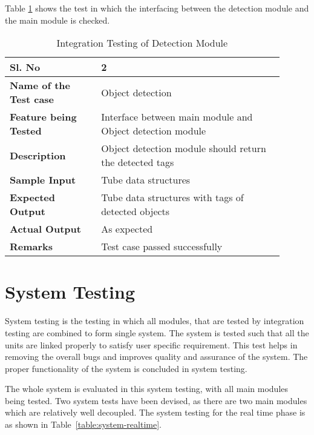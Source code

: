     Table \ref{table:integration-detection} shows the test in which the
    interfacing between the detection module and the main module is checked.

    \FloatBarrier
    \begin{table}[H]
        \caption{Integration Testing of Detection Module}
        \begin{tabular}{|p{0.3\linewidth}|p{0.6\linewidth}|}
            \hline
            \textbf{Sl. No }              &\textbf{ 2}\\
            \hline
            \textbf{Name of the Test case}& Object detection \\
            \hline
            \textbf{Feature being Tested}  & Interface between main module and
            Object detection module \\
            \hline
            \textbf{Description}           & Object detection module should
            return the detected tags \\
            \hline
            \textbf{Sample Input}          & Tube data structures \\
            \hline
            \textbf{Expected Output}       & Tube data structures with tags of
            detected objects \\
            \hline
            \textbf{Actual Output}         & As expected \\
            \hline
            \textbf{Remarks }              & Test case passed successfully \\
            \hline
        \end{tabular}
        \label{table:integration-detection}
    \end{table}

\section{System Testing}

System testing is the testing in which all modules, that are tested by
integration testing are combined to form single system. The system is tested
such that all the units are linked properly to satisfy user specific
requirement. This test helps in removing the overall bugs and improves quality
and assurance of the system. The proper functionality of the system
is concluded in system testing.

The whole system is evaluated in this system testing, with all main modules
being tested. Two system tests have been devised, as there are two main modules
which are relatively well decoupled. The system testing for the real time phase
is as shown in Table~\ref{table:system-realtime}.

